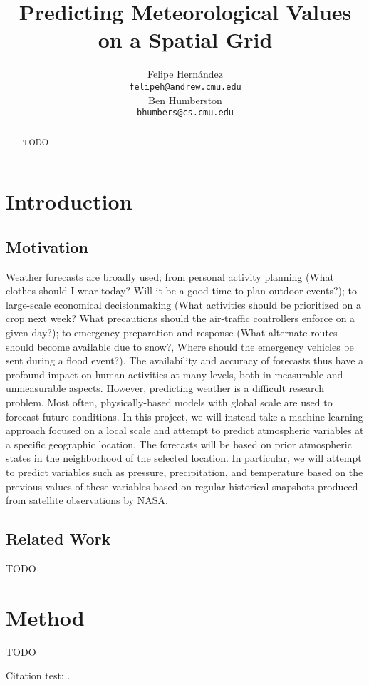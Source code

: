\documentclass{article} %
\title{Predicting Meteorological Values on a Spatial Grid}
\author{
Felipe Hern\'{a}ndez \\
\texttt{felipeh@andrew.cmu.edu} \\
\And
Ben Humberston\\
\texttt{bhumbers@cs.cmu.edu} \\
}
\begin{document}
\maketitle

\begin{abstract}
TODO
\end{abstract}

\section{Introduction}
\label{sec:intro}

\subsection{Motivation}
\label{sec:motivation}
Weather forecasts are broadly used; from personal activity planning (What clothes should I wear 
today? Will it be a good time to plan outdoor events?); to large-scale economical decisionmaking (What activities should be prioritized on a crop next week? What precautions should the 
air-traffic controllers enforce on a given day?); to emergency preparation and response (What 
alternate routes should become available due to snow?, Where should the emergency vehicles 
be sent during a flood event?). The availability and accuracy of forecasts thus have a profound 
impact on human activities at many levels, both in measurable and unmeasurable aspects.
However, predicting weather is a difficult research problem. Most often, physically-based 
models with global scale are used to forecast future conditions. In this project, we will instead 
take a machine learning approach focused on a local scale and attempt to predict atmospheric 
variables at a specific geographic location. The forecasts will be based on prior atmospheric 
states in the neighborhood of the selected location. In particular, we will attempt to predict 
variables such as pressure, precipitation, and temperature based on the previous values of 
these variables based on regular historical snapshots produced from satellite observations by 
NASA.

\subsection{Related Work}\label{sec:related_work}
TODO

\section{Method}
\label{sec:method}
TODO

Citation test: \cite{Durban2001}.



\end{document}
